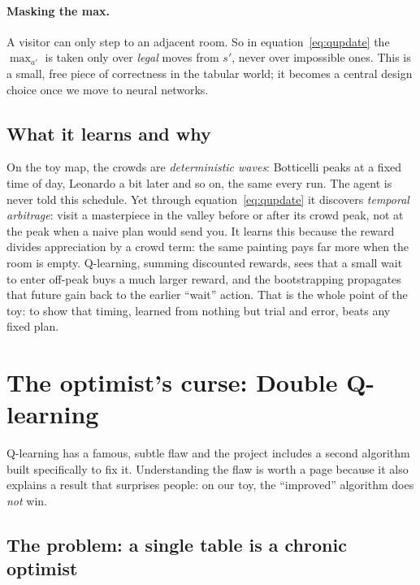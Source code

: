 \documentclass[11pt]{article}
\newcommand{\key}[1]{\textit{#1}}            %
\newcommand{\why}[1]{\textcolor{inkblue}{#1}}
\begin{document}
\paragraph{Masking the max.} A visitor can only step to an adjacent room. So in
equation~\eqref{eq:qupdate} the $\max_{a'}$ is taken only over \emph{legal} moves from
$s'$, never over impossible ones. This is a small, free piece of correctness in the
tabular world; it becomes a central design choice once we move to neural networks.

\subsection{What it learns and why}

On the toy map, the crowds are \key{deterministic waves}: Botticelli peaks at a fixed time
of day, Leonardo a bit later and so on, the same every run. The agent is never told this
schedule. Yet through equation~\eqref{eq:qupdate} it discovers \key{temporal arbitrage}:
visit a masterpiece in the valley before or after its crowd peak, not at the peak when a
naive plan would send you. \why{It learns this because the reward divides appreciation by
a crowd term: the same painting pays far more when the room is empty. Q-learning, summing
discounted rewards, sees that a small wait to enter off-peak buys a much larger reward,
and the bootstrapping propagates that future gain back to the earlier ``wait'' action.}
That is the whole point of the toy: to show that timing, learned from nothing but trial
and error, beats any fixed plan.

\section{The optimist's curse: Double Q-learning}\label{sec:doubleq}

Q-learning has a famous, subtle flaw and the project includes a second algorithm built
specifically to fix it. Understanding the flaw is worth a page because it also explains a
result that surprises people: on our toy, the ``improved'' algorithm does \emph{not} win.

\subsection{The problem: a single table is a chronic optimist}
\end{document}
